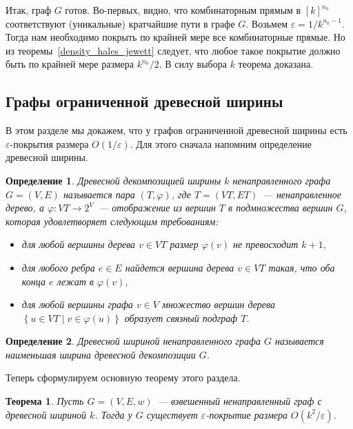 \documentclass[12pt]{article}
\newcommand{\eps}{\varepsilon}
\newcommand{\set}[1]{\left\{#1\right\}}
\newcommand{\setst}[2]{\set{#1 \mid #2}}
\newtheorem{definition}{Определение}
\newtheorem{theorem}{Теорема}
\begin{document}
    Итак, граф $G$ готов.
    Во-первых, видно, что комбинаторным прямым в $[k]^{n_0}$ соответствуют (уникальные) кратчайшие пути в графе $G$.
    Возьмем $\varepsilon = 1 / k^{n_0-1}$. Тогда нам необходимо покрыть по крайней мере
    все комбинаторные прямые.
    Но из теоремы~\ref{density_hales_jewett} следует,
    что любое такое покрытие должно быть по крайней мере размера
    $k^{n_0} / 2$. В силу выбора $k$ теорема доказана.

    \subsection{Графы ограниченной древесной ширины}
    \label{subsection_bounded_treewidth}
    В этом разделе мы докажем, что у графов ограниченной древесной ширины есть $\eps$-покрытия размера $O(1 / \eps)$.
    Для этого сначала напомним определение древесной ширины.
    \begin{definition}
        \emph{Древесной декомпозицией ширины $k$} ненаправленного графа $G = (V, E)$ называется пара $(T, \varphi)$,
        где $T = (VT, ET)$~--- ненаправленное дерево, а $\varphi \colon VT \to 2^V$~--- отображение из вершин $T$
        в подмножества вершин $G$, которая удовлетворяет следующим требованиям:
        \begin{itemize}
            \item для любой вершины дерева $v \in VT$ размер $\varphi(v)$ не превосходит $k + 1$, 
            \item для любого ребра $e \in E$ найдется вершина дерева $v \in VT$ такая, что оба конца $e$ лежат в $\varphi(v)$,
            \item для любой вершины графа $v \in V$ множество вершин дерева $\setst{u \in VT}{v \in \varphi(u)}$ образует
            связный подграф $T$.
        \end{itemize}
    \end{definition}
    \begin{definition}
        \emph{Древесной шириной} ненаправленного графа $G$ называется наименьшая ширина древесной декомпозиции $G$.
    \end{definition}
    Теперь сформулируем основную теорему этого раздела.
    \begin{theorem}
        Пусть $G = (V, E, w)$~--- взвешенный ненаправленный граф с древесной шириной $k$. Тогда у $G$
        существует $\eps$-покрытие размера $O(k^2 / \eps)$.
    \end{theorem}
\end{document}
